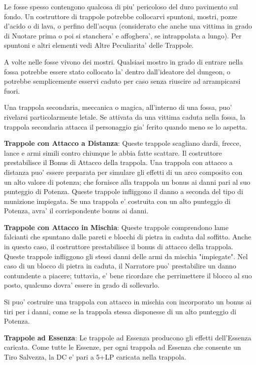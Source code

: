 \documentclass[a4paper,11pt,twoside,openany]{book}
\begin{document}
{Le fosse spesso contengono qualcosa di piu' pericoloso del duro pavimento sul fondo. Un costruttore di trappole potrebbe collocarvi spuntoni, mostri, pozze d'acido o di lava, o perfino dell'acqua (considerato che anche una vittima in grado di Nuotare prima o poi si stanchera' e affoghera', se intrappolata a lungo). Per spuntoni e altri elementi vedi Altre Peculiarita' delle Trappole.

A volte nelle fosse vivono dei mostri. Qualsiasi mostro in grado di entrare nella fossa potrebbe essere stato collocato la' dentro dall'ideatore del dungeon, o potrebbe semplicemente esservi caduto per caso senza riuscire ad arrampicarsi fuori.

Una trappola secondaria, meccanica o magica, all'interno di una fossa, puo' rivelarsi particolarmente letale. Se attivata da una vittima caduta nella fossa, la trappola secondaria attacca il personaggio gia' ferito quando meno se lo aspetta.

\textbf{Trappole con Attacco a Distanza}: Queste trappole scagliano dardi, frecce, lance e armi simili contro chiunque le abbia fatte scattare. Il costruttore prestabilisce il Bonus di Attacco della trappola. Una trappola con attacco a distanza puo' essere preparata per simulare gli effetti di un arco composito con un alto valore di potenza; che fornisce alla trappola un bonus ai danni pari al suo punteggio di Potenza. Queste trappole infliggono il danno a seconda del tipo di munizione impiegata. Se una trappola e' costruita con un alto punteggio di Potenza, avra' il corrispondente bonus ai danni.

\textbf{Trappole con Attacco in Mischia}: Queste trappole comprendono lame falcianti che spuntano dalle pareti e blocchi di pietra in caduta dal soffitto. Anche in questo caso, il costruttore prestabilisce il bonus di attacco della trappola. Queste trappole infliggono gli stessi danni delle armi da mischia "impiegate". Nel caso di un blocco di pietra in caduta, il Narratore puo' prestabilire un danno contundente a piacere; tuttavia, e' bene ricordare che perrimettere il blocco al suo posto, qualcuno dovra' essere in grado di sollevarlo.

Si puo' costruire una trappola con attacco in mischia con incorporato un bonus ai tiri per i danni, come se la trappola stessa disponesse di un alto punteggio di Potenza.

\textbf{Trappole ad Essenza}: Le trappole ad Essenza producono gli effetti dell'Essenza caricata. Come tutte le Essenze, per ogni trappola ad Essenza che consente un Tiro Salvezza, la DC e' pari a 5+LP caricata nella trappola.

}
\end{document}
